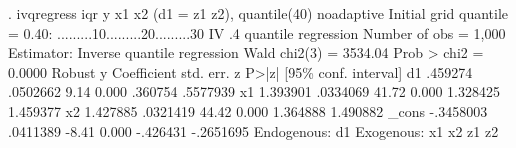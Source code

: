 . ivqregress iqr y x1 x2 (d1 = z1 z2),  quantile(40) noadaptive
{\smallskip}
Initial grid
    quantile = 0.40: .........10.........20.........30
{\smallskip}
IV .4 quantile regression                              Number of obs =   1,000
Estimator: Inverse quantile regression                 Wald chi2(3)  = 3534.04
                                                       Prob > chi2   =  0.0000
{\smallskip}
             {\VBAR}               Robust
           y {\VBAR} Coefficient  std. err.      z    P>|z|     [95\% conf. interval]
          d1 {\VBAR}    .459274   .0502662     9.14   0.000      .360754    .5577939
          x1 {\VBAR}   1.393901   .0334069    41.72   0.000     1.328425    1.459377
          x2 {\VBAR}   1.427885   .0321419    44.42   0.000     1.364888    1.490882
       _cons {\VBAR}  -.3458003   .0411389    -8.41   0.000     -.426431   -.2651695
Endogenous: d1
 Exogenous: x1 x2 z1 z2
{\smallskip}
